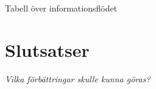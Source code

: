 \documentclass[11pt]{article}
\begin{document}
\begin{flushleft}
\begin{table}[h]
\caption{Tabell över informationsflödet} \label{tab}
\end{table}



\pagebreak
\section{Slutsatser}
\textit{Vilka förbättringar skulle kunna göras?}

\pagebreak
{}



\pagebreak


\appendix

\end{flushleft}
\end{document}
